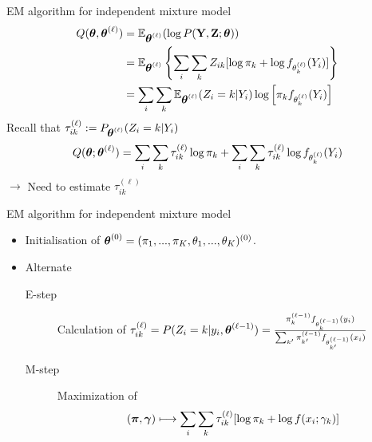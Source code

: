 \documentclass{beamer}\usepackage[]{graphicx}\usepackage[]{color}
\newcommand{\Esp}{\mathbb{E}}
\newcommand{\Ybf}{{\bf Y}}
\newcommand{\Zbf}{{\bf Z}}
\newcommand{\pibf}{\mbox{\mathversion{bold}{$\pi$}}}
\newcommand{\gammabf}{\mbox{\mathversion{bold}{$\gamma$}}}
\newcommand{\thetabf}{\mbox{\mathversion{bold}{$\theta$}}}
\begin{document}
\begin{frame}{EM algorithm for independent mixture model}
\begin{align*}
  Q(\thetabf,\thetabf^{(\ell)}) & = \Esp_{\thetabf^{(\ell)}}(\log P(\Ybf, \Zbf;\thetabf))\\
  &= \Esp_{\thetabf^{(\ell)}} \left\{\sum_i \sum_k Z_{ik} [\log \pi_k + \log
       f_{\theta_k^{(\ell)}}(Y_i)] \right\}\\
  &= \sum_i \sum_k \Esp_{\thetabf^{(\ell)}} (Z_i = k | Y_i) \log\left[\pi_k f_{\theta_k^{(\ell)}}(Y_i)\right]
  \end{align*}
   Recall that $\tau_{ik}^{(\ell)}:=P_{\thetabf^{(\ell)}}(Z_i = k | Y_i )$
   $$Q(\thetabf;\thetabf^{(\ell)})
     =\sum_i \sum_k \tau_{ik}^{(\ell)} \log \pi_k +  \sum_i \sum_k \tau_{ik}^{(\ell)}\log f_{\theta_k^{(\ell)}}(Y_i)$$
     $\rightarrow$ Need to estimate $\tau_{ik}^{(\ell)}$
\end{frame}

\begin{frame}{EM algorithm for independent mixture model}
    \begin{itemize}
    \item Initialisation of $\thetabf^{(0)}=(\pi_1, ..., \pi_K, \theta_1, ..., \theta_K)^{(0)}$.
  \pause
  \item Alternate  
      \begin{description}
      \item[E-step] Calculation of $\tau^{(\ell)}_{ik}=P(Z_i = k | y_i, \thetabf^{(\ell-1)}) = \frac{\pi^{(\ell-1)}_k f_{\theta^{(\ell-1)}_k}(y_i)}{\sum_{k'} \pi^{(\ell-1)}_{k'}f_{\theta^{(\ell-1)}_{k'}}(x_i)}$

      \item[M-step] Maximization of
        $$
        (\pibf, \gammabf) \longmapsto \sum_i \sum_k \tau_{ik}^{(\ell)} [\log \pi_k +
          \log f(x_i; \gamma_k)]
        $$
      \end{description} 
    \end{itemize}
\end{frame}
\end{document}
